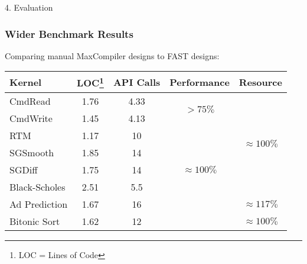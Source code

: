 \begin{frame}{4. Evaluation}
  \frametitle{Wider Benchmark Results}
  Comparing manual MaxCompiler designs to FAST designs:
  {\footnotesize
    \begin{table}
      \renewcommand{\arraystretch}{1.5}
      \begin{tabular}{l|c|c|c|c}
        \textbf{Kernel} & \textbf{LOC\footnote{LOC = Lines of Code}} & \textbf{API Calls} & \textbf{Performance}              & \textbf{Resource}
        \\
        \hline\hline
        CmdRead         & 1.76               & 4.33                     & \multirow{2}{1.5cm}{$ > 75\%$}        & \multirow{6}{1.5cm}{$\approx 100\%$} \\
        CmdWrite        & 1.45               & 4.13                     &                                   &                              \\
        \cline{1-4}
        RTM             & 1.17               & 10                       & \multirow{5}{1.5cm}{$ \approx 100\%$} &                              \\
        SGSmooth        & 1.85               & 14                       &                                   &                              \\
        SGDiff         & 1.75               & 14                       &                                   &                              \\
        Black-Scholes   & 2.51               & 5.5                      &                                   &                              \\
        \cline{5-5}
        Ad Prediction  & 1.67               & 16                       &                                   &    $ \approx 117 \% $                          \\
        Bitonic Sort & 1.62             & 12                    &                                   &    $ \approx 100 \% $                          \\
      \end{tabular}
    \end{table}}

\end{frame}